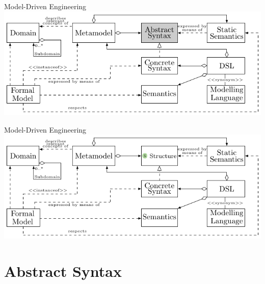 	\begin{frame}[noframenumbering]{Model-Driven Engineering}
		\includegraphics[width=\textwidth]{tikz/mdsd_concept_1.pdf}
	\end{frame}	
	
	\begin{frame}[noframenumbering]{Model-Driven Engineering}
		\includegraphics[width=\textwidth]{tikz/mdsd_concept_2.pdf}
	\end{frame}


	\section{Abstract Syntax}
	
